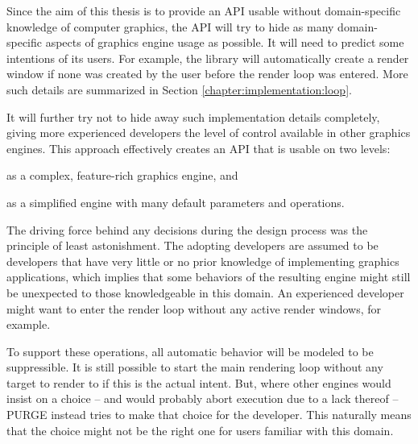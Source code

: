 Since the aim of this thesis is to provide an API usable without domain-specific knowledge of computer graphics, the API will try to hide as many domain-specific aspects of graphics engine usage as possible. It will need to predict some intentions of its users. For example, the library will automatically create a render window if none was created by the user before the render loop was entered. More such details are summarized in Section \ref{chapter:implementation:loop}.

It will further try not to hide away such implementation details completely, giving more experienced developers the level of control available in other graphics engines. This approach effectively creates an API that is usable on two levels:

\begin{smalllist}
	\item as a complex, feature-rich graphics engine, and
	\item as a simplified engine with many default parameters and operations.
\end{smalllist}

The driving force behind any decisions during the design process was the principle of least astonishment\cite{Saltzer:2009:PCS:1594884}. The adopting developers are assumed to be developers that have very little or no prior knowledge of implementing graphics applications, which implies that some behaviors of the resulting engine might still be unexpected to those knowledgeable in this domain. An experienced developer might want to enter the render loop without any active render windows, for example.

To support these operations, all automatic behavior will be modeled to be suppressible. It is still possible to start the main rendering loop without any target to render to if this is the actual intent. But, where other engines would insist on a choice -- and would probably abort execution due to a lack thereof -- PURGE instead tries to make that choice for the developer. This naturally means that the choice might not be the right one for users familiar with this domain.

